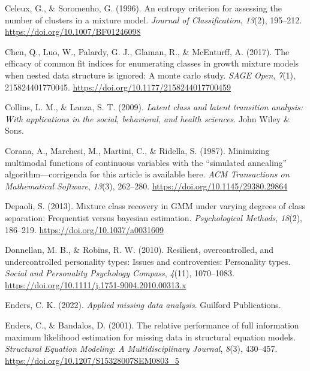 \documentclass[
  ,man,floatsintext]{apa6}
\newlength{\cslhangindent}
\newlength{\cslentryspacingunit} %
\newenvironment{CSLReferences}[2] %
 {%
  \setlength{\parindent}{0pt}
  \ifodd #1
  \let\oldpar\par
  \def\par{\hangindent=\cslhangindent\oldpar}
  \fi
  \setlength{\parskip}{#2\cslentryspacingunit}
 }%
 {}
\begin{document}
\begin{CSLReferences}{1}{0}
\leavevmode{}%
Celeux, G., \& Soromenho, G. (1996). An entropy criterion for assessing the number of clusters in a mixture model. \emph{Journal of Classification}, \emph{13}(2), 195--212. \url{https://doi.org/10.1007/BF01246098}

\leavevmode{}%
Chen, Q., Luo, W., Palardy, G. J., Glaman, R., \& McEnturff, A. (2017). The efficacy of common fit indices for enumerating classes in growth mixture models when nested data structure is ignored: A monte carlo study. \emph{{SAGE} Open}, \emph{7}(1), 215824401770045. \url{https://doi.org/10.1177/2158244017700459}

\leavevmode{}%
Collins, L. M., \& Lanza, S. T. (2009). \emph{Latent class and latent transition analysis: With applications in the social, behavioral, and health sciences}. John Wiley \& Sons.

\leavevmode{}%
Corana, A., Marchesi, M., Martini, C., \& Ridella, S. (1987). Minimizing multimodal functions of continuous variables with the {``simulated annealing''} algorithm---corrigenda for this article is available here. \emph{{ACM} Transactions on Mathematical Software}, \emph{13}(3), 262--280. \url{https://doi.org/10.1145/29380.29864}

\leavevmode{}%
Depaoli, S. (2013). Mixture class recovery in {GMM} under varying degrees of class separation: Frequentist versus bayesian estimation. \emph{Psychological Methods}, \emph{18}(2), 186--219. \url{https://doi.org/10.1037/a0031609}

\leavevmode{}%
Donnellan, M. B., \& Robins, R. W. (2010). Resilient, overcontrolled, and undercontrolled personality types: Issues and controversies: Personality types. \emph{Social and Personality Psychology Compass}, \emph{4}(11), 1070--1083. \url{https://doi.org/10.1111/j.1751-9004.2010.00313.x}

\leavevmode{}%
Enders, C. K. (2022). \emph{Applied missing data analysis}. Guilford Publications.

\leavevmode{}%
Enders, C., \& Bandalos, D. (2001). The relative performance of full information maximum likelihood estimation for missing data in structural equation models. \emph{Structural Equation Modeling: A Multidisciplinary Journal}, \emph{8}(3), 430--457. \url{https://doi.org/10.1207/S15328007SEM0803_5}


\end{CSLReferences}
\end{document}
